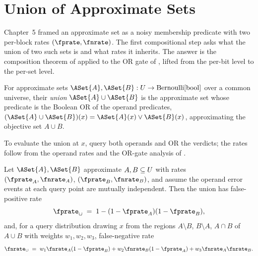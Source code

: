 %

\section{Union of Approximate Sets}
\label{sec:union-of-sets}

Chapter~5 framed an approximate set as a noisy membership predicate with
two per-block rates $(\fprate, \fnrate)$. The first compositional step asks
what the union of two such sets is and what rates it inherits. The answer is
the composition theorem of 
applied to the OR gate of , lifted from the
per-bit level to the per-set level.

\begin{definition}
\label{def:union-of-sets}
For approximate sets $\ASet{A}, \ASet{B} : \Universe \to
\Bernoulli{\BoolType}$ over a common universe, their \emph{union}
$\ASet{A} \cup \ASet{B}$ is the approximate set whose predicate is the
Boolean OR of the operand predicates, $(\ASet{A} \cup \ASet{B})(x) =
\ASet{A}(x) \lor \ASet{B}(x)$, approximating the objective set $A \cup B$.
\end{definition}

To evaluate the union at $x$, query both operands and OR the verdicts;
the rates follow from the operand rates and the OR-gate analysis of
.

\begin{proposition}
\label{prop:union-fpr-fnr}
Let $\ASet{A}, \ASet{B}$ approximate $A, B \subseteq U$ with rates
$(\fprate_A, \fnrate_A)$, $(\fprate_B, \fnrate_B)$, and assume the operand
error events at each query point are mutually independent. Then the union
has false-positive rate
\begin{equation}
\label{eq:union-fpr}
  \fprate_\cup \;=\; 1 - (1 - \fprate_A)(1 - \fprate_B),
\end{equation}
and, for a query distribution drawing $x$ from the regions $A \setminus B$,
$B \setminus A$, $A \cap B$ of $A \cup B$ with weights $w_1, w_2, w_3$,
false-negative rate
\begin{equation}
\label{eq:union-fnr}
  \fnrate_\cup
  \;=\; w_1 \fnrate_A (1 - \fprate_B)
        + w_2 \fnrate_B (1 - \fprate_A)
        + w_3 \fnrate_A \fnrate_B.
\end{equation}
\end{proposition}

